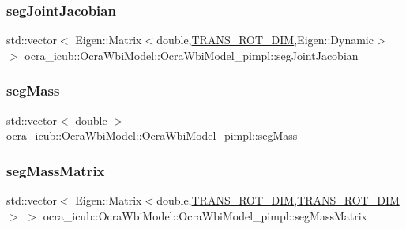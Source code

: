 \hypertarget{structOcraWbiModel_1_1OcraWbiModel__pimpl_a4e1b970fc381b8c93bb41e4b3854986c}{}\label{structOcraWbiModel_1_1OcraWbiModel__pimpl_a4e1b970fc381b8c93bb41e4b3854986c} 
\subsubsection{\texorpdfstring{seg\+Joint\+Jacobian}{segJointJacobian}}
{\footnotesize\ttfamily std\+::vector$<$ Eigen\+::\+Matrix$<$double,\hyperlink{OcraWbiModel_8cpp_ab4a87cb824ceff256c6b8bce7701af58}{T\+R\+A\+N\+S\+\_\+\+R\+O\+T\+\_\+\+D\+IM},Eigen\+::\+Dynamic$>$ $>$ ocra\+\_\+icub\+::\+Ocra\+Wbi\+Model\+::\+Ocra\+Wbi\+Model\+\_\+pimpl\+::seg\+Joint\+Jacobian}

\hypertarget{structOcraWbiModel_1_1OcraWbiModel__pimpl_a6cdb912e87fd9cea517e098615c8f945}{}\label{structOcraWbiModel_1_1OcraWbiModel__pimpl_a6cdb912e87fd9cea517e098615c8f945} 
\subsubsection{\texorpdfstring{seg\+Mass}{segMass}}
{\footnotesize\ttfamily std\+::vector$<$ double $>$ ocra\+\_\+icub\+::\+Ocra\+Wbi\+Model\+::\+Ocra\+Wbi\+Model\+\_\+pimpl\+::seg\+Mass}

\hypertarget{structOcraWbiModel_1_1OcraWbiModel__pimpl_a3d0cb4cfda4c6ce54020d61f5845dedb}{}\label{structOcraWbiModel_1_1OcraWbiModel__pimpl_a3d0cb4cfda4c6ce54020d61f5845dedb} 
\subsubsection{\texorpdfstring{seg\+Mass\+Matrix}{segMassMatrix}}
{\footnotesize\ttfamily std\+::vector$<$ Eigen\+::\+Matrix$<$double,\hyperlink{OcraWbiModel_8cpp_ab4a87cb824ceff256c6b8bce7701af58}{T\+R\+A\+N\+S\+\_\+\+R\+O\+T\+\_\+\+D\+IM},\hyperlink{OcraWbiModel_8cpp_ab4a87cb824ceff256c6b8bce7701af58}{T\+R\+A\+N\+S\+\_\+\+R\+O\+T\+\_\+\+D\+IM}$>$ $>$ ocra\+\_\+icub\+::\+Ocra\+Wbi\+Model\+::\+Ocra\+Wbi\+Model\+\_\+pimpl\+::seg\+Mass\+Matrix}

